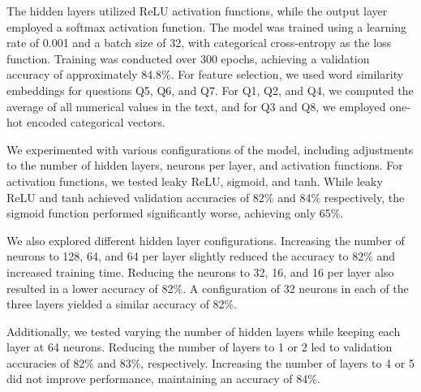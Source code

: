 The hidden layers utilized ReLU activation functions, while the output layer employed a softmax activation function. The model was trained using a learning rate of 0.001 and a batch size of 32, with categorical cross-entropy as the loss function. Training was conducted over 300 epochs, achieving a validation accuracy of approximately 84.8\%. For feature selection, we used word similarity embeddings for questions Q5, Q6, and Q7. For Q1, Q2, and Q4, we computed the average of all numerical values in the text, and for Q3 and Q8, we employed one-hot encoded categorical vectors.

We experimented with various configurations of the model, including adjustments to the number of hidden layers, neurons per layer, and activation functions. For activation functions, we tested leaky ReLU, sigmoid, and tanh. While leaky ReLU and tanh achieved validation accuracies of 82\% and 84\% respectively, the sigmoid function performed significantly worse, achieving only 65\%.

We also explored different hidden layer configurations. Increasing the number of neurons to 128, 64, and 64 per layer slightly reduced the accuracy to 82\% and increased training time. Reducing the neurons to 32, 16, and 16 per layer also resulted in a lower accuracy of 82\%. A configuration of 32 neurons in each of the three layers yielded a similar accuracy of 82\%.

Additionally, we tested varying the number of hidden layers while keeping each layer at 64 neurons. Reducing the number of layers to 1 or 2 led to validation accuracies of 82\% and 83\%, respectively. Increasing the number of layers to 4 or 5 did not improve performance, maintaining an accuracy of 84\%.

